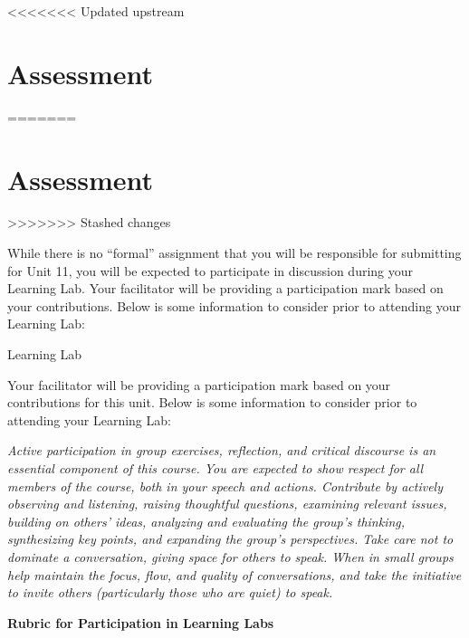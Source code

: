 \documentclass[
]{book}
\begin{document}
<<<<<<< Updated upstream
\hypertarget{assessment-10}{%
\section*{Assessment}\label{assessment-10}}
=======
\hypertarget{assessment-9}{%
\section*{Assessment}\label{assessment-9}}
>>>>>>> Stashed changes

\begin{assessment}
While there is no ``formal'' assignment that you will be responsible for submitting for Unit 11, you will be expected to participate in discussion during your Learning Lab. Your facilitator will be providing a participation mark based on your contributions. Below is some information to consider prior to attending your Learning Lab:

{Learning Lab}

Your facilitator will be providing a participation mark based on your contributions for this unit. Below is some information to consider prior to attending your Learning Lab:

\emph{Active participation in group exercises, reflection, and critical discourse is an essential component of this course. You are expected to show respect for all members of the course, both in your speech and actions. Contribute by actively observing and listening, raising thoughtful questions, examining relevant issues, building on others' ideas, analyzing and evaluating the group's thinking, synthesizing key points, and expanding the group's perspectives. Take care not to dominate a conversation, giving space for others to speak. When in small groups help maintain the focus, flow, and quality of conversations, and take the initiative to invite others (particularly those who are quiet) to speak.}

\textbf{Rubric for Participation in Learning Labs}


\end{assessment}
\end{document}
